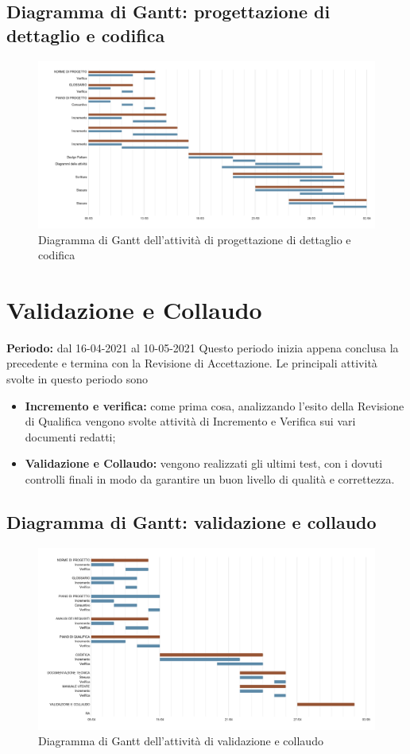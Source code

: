 \subsection{Diagramma di Gantt: progettazione di dettaglio e codifica}\label{PianificazioneDiagrammaDiGanttProgettazioneDettaglio}
\begin{figure}[!ht]
	\begin{center}
		\includegraphics[width=0.8\linewidth]{../immagini/pdp/gantt_progettazione_dettaglio.png}
		\caption{Diagramma di Gantt dell'attività di progettazione di dettaglio e codifica}
	\end{center}
\end{figure}
\section{Validazione e Collaudo}\label{PianificazioneValidazione}
\textbf{Periodo:} dal 16-04-2021 al 10-05-2021
Questo periodo inizia appena conclusa la precedente e termina con la Revisione di Accettazione.
Le principali attività svolte in questo periodo sono
\begin{itemize}
	\item \textbf{Incremento e verifica:} come prima cosa, analizzando l'esito della Revisione di Qualifica vengono svolte attività di Incremento e Verifica sui vari documenti redatti;
	\item \textbf{Validazione e Collaudo:} vengono realizzati gli ultimi test, con i dovuti controlli finali in modo da garantire un buon livello di qualità e correttezza.
\end{itemize}
\subsection{Diagramma di Gantt: validazione e collaudo}\label{PianificazioneDiagrammaDiGanttValidazione}
\begin{figure}[!ht]
	\begin{center}
		\includegraphics[width=0.8\linewidth]{../immagini/pdp/gantt_validazione.png}
		\caption{Diagramma di Gantt dell'attività di validazione e collaudo}
	\end{center}
\end{figure}